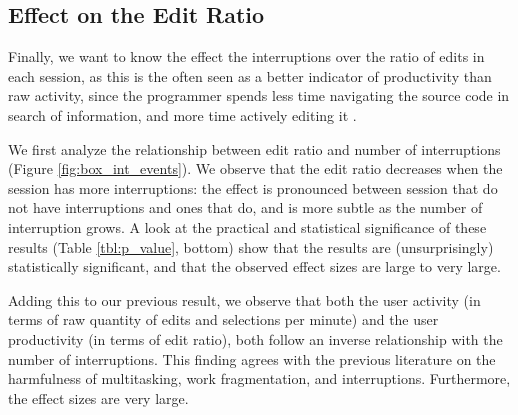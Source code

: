 \documentclass[times]{smrauth}
\begin{document}
\subsection{Effect on the Edit Ratio}
Finally, we want to know the effect the interruptions over the ratio of edits in each session, as this is the often seen as a better indicator of productivity than raw activity, since the programmer spends less time navigating the source code in search of information, and more time actively editing it \cite{KM06}.

We first analyze the relationship between edit ratio and number of interruptions (Figure \ref{fig:box_int_events}). We observe that the edit ratio decreases when the session has more interruptions: the effect is pronounced between session that do not have interruptions and ones that do, and is more subtle as the number of interruption grows. A look at the practical and statistical significance of these results (Table \ref{tbl:p_value}, bottom) show that the results are (unsurprisingly) statistically significant, and that the observed effect sizes are large to very large.

Adding this to our previous result, we observe that both the user activity (in terms of raw quantity of edits and selections per minute) and the user productivity (in terms of edit ratio), both follow an inverse relationship with the number of interruptions. This finding agrees with the previous literature on the harmfulness of multitasking, work fragmentation, and interruptions. Furthermore, the effect sizes are very large.

\end{document}
